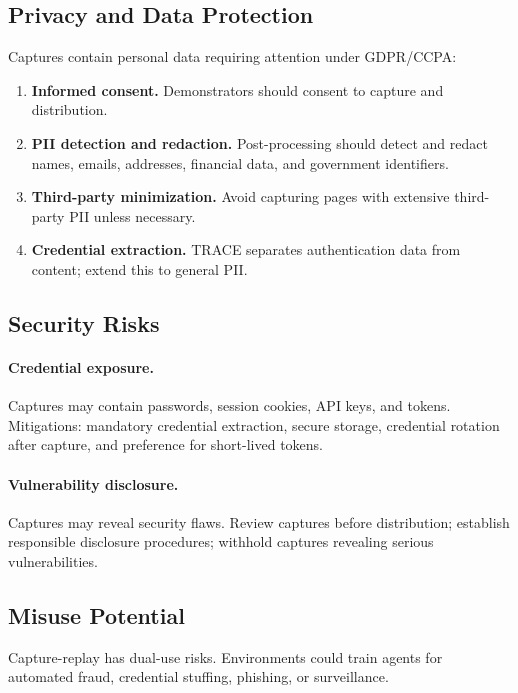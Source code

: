\documentclass[letterpaper]{article}
\begin{document}
\subsection{Privacy and Data Protection}

Captures contain personal data requiring attention under GDPR/CCPA:

\begin{enumerate}
    \item \textbf{Informed consent.} Demonstrators should consent to capture and distribution.
    \item \textbf{PII detection and redaction.} Post-processing should detect and redact names, emails, addresses, financial data, and government identifiers.
    \item \textbf{Third-party minimization.} Avoid capturing pages with extensive third-party PII unless necessary.
    \item \textbf{Credential extraction.} TRACE separates authentication data from content; extend this to general PII.
\end{enumerate}

\subsection{Security Risks}

\paragraph{Credential exposure.} Captures may contain passwords, session cookies, API keys, and tokens. Mitigations: mandatory credential extraction, secure storage, credential rotation after capture, and preference for short-lived tokens.

\paragraph{Vulnerability disclosure.} Captures may reveal security flaws. Review captures before distribution; establish responsible disclosure procedures; withhold captures revealing serious vulnerabilities.

\subsection{Misuse Potential}

Capture-replay has dual-use risks. Environments could train agents for automated fraud, credential stuffing, phishing, or surveillance.
\end{document}
